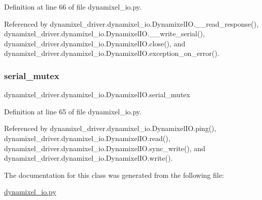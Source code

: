 Definition at line 66 of file dynamixel\+\_\+io.\+py.



Referenced by dynamixel\+\_\+driver.\+dynamixel\+\_\+io.\+Dynamixel\+I\+O.\+\_\+\+\_\+read\+\_\+response(), dynamixel\+\_\+driver.\+dynamixel\+\_\+io.\+Dynamixel\+I\+O.\+\_\+\+\_\+write\+\_\+serial(), dynamixel\+\_\+driver.\+dynamixel\+\_\+io.\+Dynamixel\+I\+O.\+close(), and dynamixel\+\_\+driver.\+dynamixel\+\_\+io.\+Dynamixel\+I\+O.\+exception\+\_\+on\+\_\+error().

\mbox{\label{classdynamixel__driver_1_1dynamixel__io_1_1_dynamixel_i_o_a67bb8729caac5df92342f0a0cb57ec8d}} 
\subsubsection{\texorpdfstring{serial\+\_\+mutex}{serial\_mutex}}
{\footnotesize\ttfamily dynamixel\+\_\+driver.\+dynamixel\+\_\+io.\+Dynamixel\+I\+O.\+serial\+\_\+mutex}



Definition at line 65 of file dynamixel\+\_\+io.\+py.



Referenced by dynamixel\+\_\+driver.\+dynamixel\+\_\+io.\+Dynamixel\+I\+O.\+ping(), dynamixel\+\_\+driver.\+dynamixel\+\_\+io.\+Dynamixel\+I\+O.\+read(), dynamixel\+\_\+driver.\+dynamixel\+\_\+io.\+Dynamixel\+I\+O.\+sync\+\_\+write(), and dynamixel\+\_\+driver.\+dynamixel\+\_\+io.\+Dynamixel\+I\+O.\+write().



The documentation for this class was generated from the following file\+:\begin{DoxyCompactItemize}
\item 
\hyperlink{dynamixel__io_8py}{dynamixel\+\_\+io.\+py}\end{DoxyCompactItemize}
